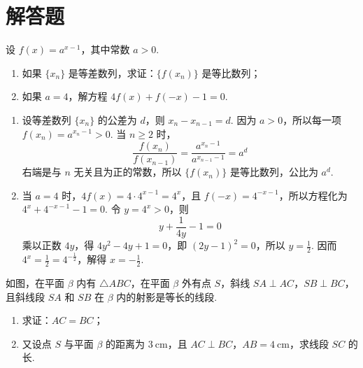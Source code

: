\section{解答题}

\begin{problem}

设 \(f(x) = a^{x - 1}\)，其中常数 \(a > 0\).

\begin{enumerate}
\item 如果 \(\{x_n\}\) 是等差数列，求证：\(\{f(x_n)\}\) 是等比数列；
\item 如果 \(a = 4\)，解方程 \(4f(x) + f(-x) - 1 = 0\).
\end{enumerate}
\end{problem}

\begin{solution}
\begin{enumerate}
\item 设等差数列 \(\{x_n\}\) 的公差为 \(d\)，则 \(x_n-x_{n-1}=d\). 因为 \(a>0\)，所以每一项 \(f(x_n)=a^{x_n-1}>0\). 当 \(n\geqslant2\) 时，
\[
\frac{f(x_n)}{f(x_{n-1})}=\frac{a^{x_n-1}}{a^{x_{n-1}-1}}=a^d
\]
右端是与 \(n\) 无关且为正的常数，所以 \(\{f(x_n)\}\) 是等比数列，公比为 \(a^d\).

\item 当 \(a=4\) 时，\(4f(x)=4\cdot4^{x-1}=4^x\)，且 \(f(-x)=4^{-x-1}\)，所以方程化为 \(4^x+4^{-x-1}-1=0\). 令 \(y=4^x>0\)，则
\[
y+\frac{1}{4y}-1=0
\]
乘以正数 \(4y\)，得 \(4y^2-4y+1=0\)，即 \((2y-1)^2=0\)，所以 \(y=\frac12\). 因而 \(4^x=\frac12=4^{-\frac{1}{2}}\)，解得 \(x=-\frac12\).
\end{enumerate}
\end{solution}

\begin{problem}

如图，在平面 \(\beta\) 内有 \(\triangle ABC\)，在平面 \(\beta\) 外有点 \(S\)，斜线 \(SA \perp AC\)，\(SB \perp BC\)，且斜线段 \(SA\) 和 \(SB\) 在 \(\beta\) 内的射影是等长的线段.

\begin{enumerate}
\item 求证：\(AC = BC\)；
\item 又设点 \(S\) 与平面 \(\beta\) 的距离为 \(3\mathrm{~cm}\)，且 \(AC \perp BC\)，\(AB = 4\mathrm{~cm}\)，求线段 \(SC\) 的长.
\end{enumerate}

\end{problem}

